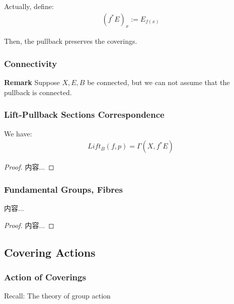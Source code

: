 \documentclass[Total.tex]{subfiles}
\begin{document}
			Actually, define:
			\begin{gather*}
				(f^*E)_x:=E_{f(x)}
			\end{gather*}
			
			Then, the pullback preserves the coverings.
			
			\subsubsection{Connectivity}
			
			\textbf{Remark} Suppose $X,E,B$ be connected, but we can not assume that the pullback is connected.
			
			\subsubsection{Lift-Pullback Sections Correspondence}
			
			\begin{proposition}
				We have:
				\begin{gather*}
					Lift_B(f,p)=\Gamma(X,f^*E)
				\end{gather*}
			\end{proposition}
			\begin{proof}
				内容...
			\end{proof}
			
			\subsubsection{Fundamental Groups, Fibres}
			
			\begin{proposition}
				内容...
			\end{proposition}
			\begin{proof}
				内容...
			\end{proof}
			\subsection{Covering Actions}
			
			\subsubsection{Action of Coverings}
			
			Recall: The theory of group action
			
\end{document}
